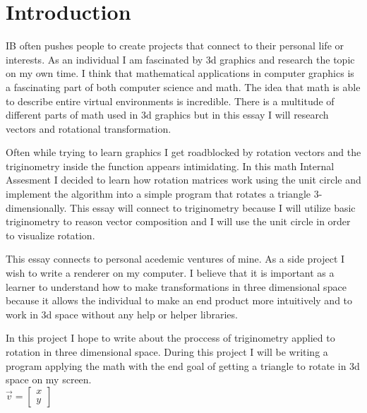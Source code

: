 \documentclass[fleqn,10pt]{SelfArx} %
\begin{document}
\maketitle %

\tableofcontents %

\thispagestyle{empty} %

\section*{Introduction}


\hspace{\parindent}
IB often pushes people to create projects that connect to their personal life or interests. As an individual I am fascinated by 3d graphics and research the topic on my own time. I think that mathematical applications in computer graphics is a fascinating part of both computer science and math. The idea that math is able to describe entire virtual environments is incredible. There is a multitude of different parts of math used in 3d graphics but in this essay I will research vectors and rotational transformation.

Often while trying to learn graphics I get roadblocked by rotation vectors and the triginometry inside the function appears intimidating. In this math Internal Assesment I decided to learn how rotation matrices work using the unit circle and implement the algorithm into a simple program that rotates a triangle 3-dimensionally. This essay will connect to triginometry because I will utilize basic triginometry to reason vector composition and I will use the unit circle in order to visualize rotation.

This essay connects to personal acedemic ventures of mine. As a side project I wish to write a renderer on my computer. I believe that it is important as a learner to understand how to make transformations in three dimensional space because it allows the individual to make an end product more intuitively and to work in 3d space without any help or helper libraries.

In this project I hope to write about the proccess of triginometry applied to rotation in three dimensional space. During this project I will be writing a program applying the math with the end goal of getting a triangle to rotate in 3d space on my screen.\\
\begin{math}
\overset{\rightarrow}{v}=\begin{bmatrix} x \\ y \end{bmatrix}
\end{math}
\end{document}

